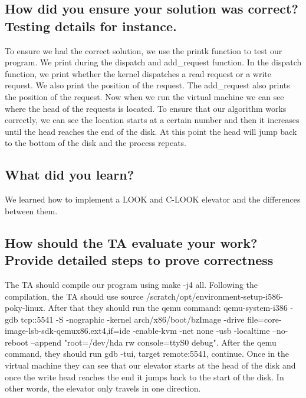 \documentclass[draftclsnofoot, onecolumn, compsoc, 10pt]{IEEEtran}
\begin{document}
    \subsection{How did you ensure your solution was correct? Testing details for instance.}
    To ensure we had the correct solution, we use the printk function to test our program. We print during the dispatch and add\_request function. In the dispatch function, we print whether the kernel dispatches a read request or a write request. We also print the position of the request. The add\_request also prints the position of the request. Now when we run the virtual machine we can see where the head of the requests is located. To ensure that our algorithm works correctly, we can see the location starts at a certain number and then it increases until the head reaches the end of the disk. At this point the head will jump back to the bottom of the disk and the process repeats.
    \subsection{What did you learn?}
    We learned how to implement a LOOK and C-LOOK elevator and the differences between them.
    \subsection{How should the TA evaluate your work? Provide detailed steps to prove correctness}
	The TA should compile our program using make -j4 all. Following the compilation, the TA should use source /scratch/opt/environment-setup-i586-poky-linux. After that they should run the qemu command: qemu-system-i386 -gdb tcp::5541 -S -nographic -kernel arch/x86/boot/bzImage -drive file=core-image-lsb-sdk-qemux86.ext4,if=ide -enable-kvm -net none -usb -localtime --no-reboot --append "root=/dev/hda rw console=ttyS0 debug". After the qemu command, they should run gdb -tui, target remote:5541, continue. Once in the virtual machine they can see that our elevator starts at the head of the disk and once the write head reaches the end it jumps back to the start of the disk. In other words, the elevator only travels in one direction.
	


\newpage
\end{document}
